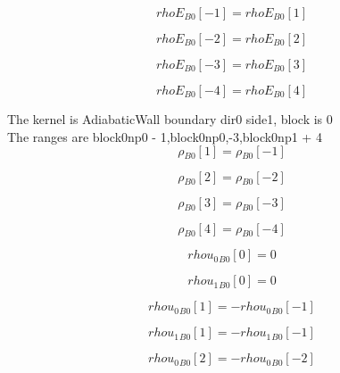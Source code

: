 \documentclass{article}
\begin{document}
\begin{dmath}{rhoE{_{B0}}}[{-1}] = {rhoE{_{B0}}}[{1}]\end{dmath}

\begin{dmath}{rhoE{_{B0}}}[{-2}] = {rhoE{_{B0}}}[{2}]\end{dmath}

\begin{dmath}{rhoE{_{B0}}}[{-3}] = {rhoE{_{B0}}}[{3}]\end{dmath}

\begin{dmath}{rhoE{_{B0}}}[{-4}] = {rhoE{_{B0}}}[{4}]\end{dmath}

\noindent The kernel is AdiabaticWall boundary dir0 side1, block is 0\\\noindent The ranges are block0np0 - 1,block0np0,-3,block0np1 + 4\\\begin{dmath}{\rho{_{B0}}}[{1}] = {\rho{_{B0}}}[{-1}]\end{dmath}

\begin{dmath}{\rho{_{B0}}}[{2}] = {\rho{_{B0}}}[{-2}]\end{dmath}

\begin{dmath}{\rho{_{B0}}}[{3}] = {\rho{_{B0}}}[{-3}]\end{dmath}

\begin{dmath}{\rho{_{B0}}}[{4}] = {\rho{_{B0}}}[{-4}]\end{dmath}

\begin{dmath}{rhou_{0}{_{B0}}}[{0}] = 0\end{dmath}

\begin{dmath}{rhou_{1}{_{B0}}}[{0}] = 0\end{dmath}

\begin{dmath}{rhou_{0}{_{B0}}}[{1}] = - {rhou_{0}{_{B0}}}[{-1}]\end{dmath}

\begin{dmath}{rhou_{1}{_{B0}}}[{1}] = - {rhou_{1}{_{B0}}}[{-1}]\end{dmath}

\begin{dmath}{rhou_{0}{_{B0}}}[{2}] = - {rhou_{0}{_{B0}}}[{-2}]\end{dmath}
\end{document}

